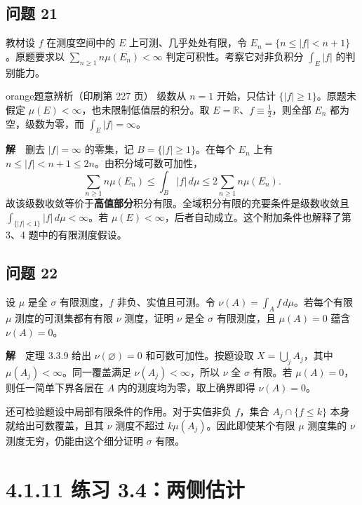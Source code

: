 \documentclass[11pt,a4paper]{article}
\begin{document}
\subsection{问题 21}\label{ux95eeux9898-21}

教材设 \(f\) 在测度空间中的 \(E\) 上可测、几乎处处有限，令
\(E_n=\{n\le|f|<n+1\}\)。原题要求以 \(\sum_{n\ge1}n\mu(E_n)<\infty\)
判定可积性。考察它对非负积分 \(\int_E |f|\) 的判别能力。

\begin{sboxenv}{orange}{题意辨析（印刷第 227 页）}
级数从 \(n=1\) 开始，只估计 \(\{|f|\ge1\}\)。原题未假定
\(\mu(E)<\infty\)，也未限制低值层的积分。取
\(E=\mathbb R\)、\(f\equiv\tfrac12\)，则全部 \(E_n\)
都为空，级数为零，而 \(\int_E|f|=\infty\)。

\end{sboxenv}

\textbf{解}　删去 \(|f|=\infty\) 的零集，记 \(B=\{|f|\ge1\}\)。在每个
\(E_n\) 上有 \(n\le|f|<n+1\le2n\)。由积分域可数可加性， \begin{equation*}
\sum_{n\ge1}n\mu(E_n)\le\int_B|f|\,d\mu
\le2\sum_{n\ge1}n\mu(E_n).
\end{equation*}
故该级数收敛等价于\textbf{高值部分}积分有限。全域积分有限的充要条件是级数收敛且
\(\int_{\{|f|<1\}}|f|\,d\mu<\infty\)。若
\(\mu(E)<\infty\)，后者自动成立。这个附加条件也解释了第 3、4
题中的有限测度假设。

\subsection{问题 22}\label{ux95eeux9898-22}

设 \(\mu\) 是全 \(\sigma\) 有限测度，\(f\) 非负、实值且可测。令
\(\nu(A)=\int_A f\,d\mu\)。若每个有限 \(\mu\) 测度的可测集都有有限
\(\nu\) 测度，证明 \(\nu\) 是全 \(\sigma\) 有限测度，且 \(\mu(A)=0\)
蕴含 \(\nu(A)=0\)。

\textbf{解}　定理 3.3.9 给出 \(\nu(\varnothing)=0\)
和可数可加性。按题设取 \(X=\bigcup_j A_j\)，其中
\(\mu(A_j)<\infty\)。同一覆盖满足 \(\nu(A_j)<\infty\)，所以 \(\nu\) 全
\(\sigma\) 有限。若 \(\mu(A)=0\)，则任一简单下界各层在 \(A\)
内的测度均为零，取上确界即得 \(\nu(A)=0\)。

还可检验题设中局部有限条件的作用。对于实值非负 \(f\)，集合
\(A_j\cap\{f\le k\}\) 本身就给出可数覆盖，且其 \(\nu\) 测度不超过
\(k\mu(A_j)\)。因此即使某个有限 \(\mu\) 测度集的 \(\nu\)
测度无穷，仍能由这个细分证明 \(\sigma\) 有限。

\clearpage\section[\S{}4.1.11 练习
3.4：两侧估计]{4.1.11 练习
3.4：两侧估计}\label{ux7ec3ux4e60-3.4ux4e24ux4fa7ux4f30ux8ba1}
\end{document}
